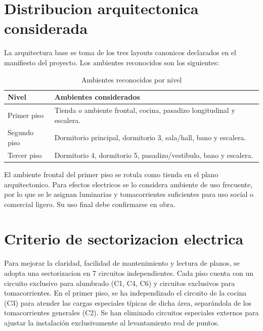 \section{Distribucion arquitectonica considerada}

La arquitectura base se toma de los tres layouts canonicos declarados en el manifiesto del proyecto. Los ambientes reconocidos son los siguientes:

\begin{table}[H]
\centering
\small
\caption{Ambientes reconocidos por nivel}
\label{tab:ambientes-reconocidos}
\begin{tabularx}{\textwidth}{L{2.4cm}Y}
\toprule
\textbf{Nivel} & \textbf{Ambientes considerados} \\
\midrule
Primer piso & Tienda o ambiente frontal, cocina, pasadizo longitudinal y escalera. \\
Segundo piso & Dormitorio principal, dormitorio 3, sala/hall, bano y escalera. \\
Tercer piso & Dormitorio 4, dormitorio 5, pasadizo/vestibulo, bano y escalera. \\
\bottomrule
\end{tabularx}
\end{table}

El ambiente frontal del primer piso se rotula como tienda en el plano arquitectonico. Para efectos electricos se lo considera ambiente de uso frecuente, por lo que se le asignan luminarias y tomacorrientes suficientes para uso social o comercial ligero. Su uso final debe confirmarse en obra.

\section{Criterio de sectorizacion electrica}

Para mejorar la claridad, facilidad de mantenimiento y lectura de planos, se adopta una sectorizacion en 7 circuitos independientes. Cada piso cuenta con un circuito exclusivo para alumbrado (C1, C4, C6) y circuitos exclusivos para tomacorrientes. En el primer piso, se ha independizado el circuito de la cocina (C3) para atender las cargas especiales típicas de dicha área, separándola de los tomacorrientes generales (C2). Se han eliminado circuitos especiales externos para ajustar la instalación exclusivamente al levantamiento real de puntos.

